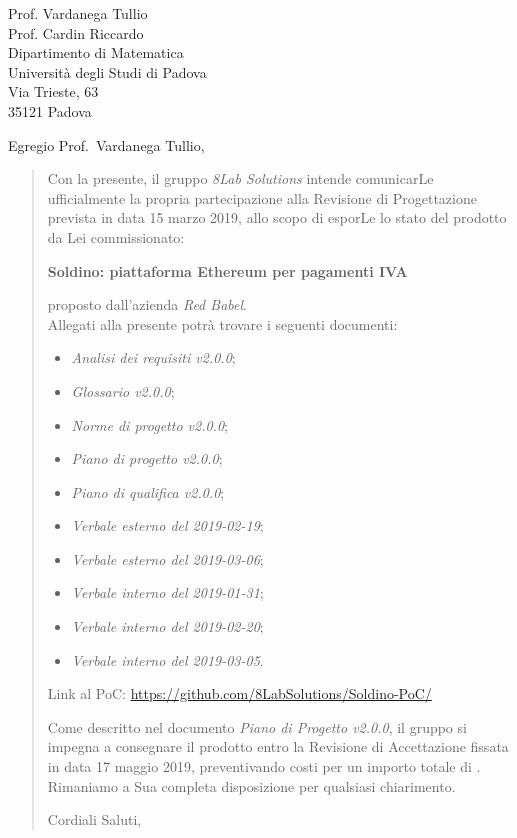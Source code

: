 
\begin{letter}{
		Prof. Vardanega Tullio \\
		Prof. Cardin Riccardo \\
		Dipartimento di Matematica \\
		Università degli Studi di Padova \\
		Via Trieste, 63 \\
		35121 Padova}
		
\opening{Egregio Prof.~Vardanega Tullio,}

\begin{quotation}
Con la presente, il gruppo \textit{8Lab Solutions} intende 
comunicarLe ufficialmente la propria partecipazione alla Revisione di 
Progettazione prevista in data 15 marzo 2019, allo scopo di 
esporLe lo stato del prodotto da Lei commissionato:

\begin{center}
	\textbf{Soldino: piattaforma Ethereum per pagamenti IVA}
\end{center}

\noindent proposto dall'azienda \textit{Red Babel}. \\
Allegati alla presente potrà trovare i seguenti documenti:

\begin{itemize}
	\item \textit{Analisi dei requisiti v2.0.0};
	
	\item \textit{Glossario v2.0.0};
	
	\item \textit{Norme di progetto v2.0.0};

	\item \textit{Piano di progetto v2.0.0};

	\item \textit{Piano di qualifica v2.0.0};
	
	\item \textit{Verbale esterno del 2019-02-19};
	\item \textit{Verbale esterno del 2019-03-06};
	\item \textit{Verbale interno del 2019-01-31};
	\item \textit{Verbale interno del 2019-02-20};
	\item \textit{Verbale interno del 2019-03-05}.
\end{itemize}
	Link al PoC: 
	\url{https://github.com/8LabSolutions/Soldino-PoC/}


\noindent Come descritto nel documento \textit{Piano di Progetto v2.0.0}, il 
gruppo si impegna a consegnare il prodotto entro la Revisione di Accettazione 
fissata in data 17 maggio 2019, preventivando costi per un importo 
totale di \textbf{}.\\
Rimaniamo a Sua completa disposizione per qualsiasi chiarimento.

\vspace{0.5cm}
\noindent Cordiali Saluti,
\closing{}	

\end{quotation}
		
\end{letter}

